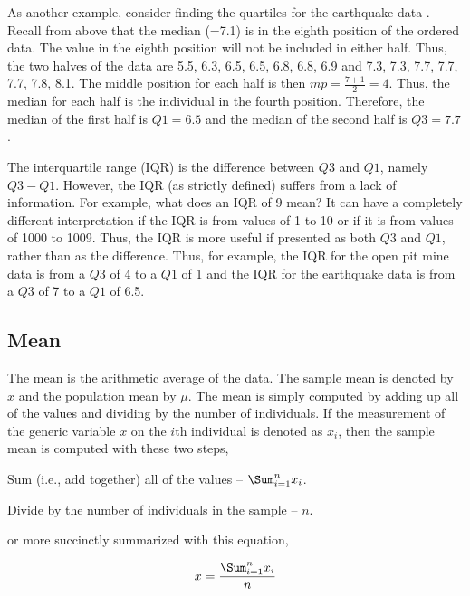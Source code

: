 \documentclass[10pt,openany]{book}\usepackage[]{graphicx}\usepackage[]{color}
\begin{document}
As another example, consider finding the quartiles for the earthquake data . Recall from above  that the median (=7.1) is in the eighth position of the ordered data. The value in the eighth position will not be included in either half. Thus, the two halves of the data are 5.5, 6.3, 6.5, 6.5, 6.8, 6.8, 6.9 and 7.3, 7.3, 7.7, 7.7, 7.7, 7.8, 8.1. The middle position for each half is then $mp=\frac{7+1}{2}=4$. Thus, the median for each half is the individual in the fourth position. Therefore, the median of the first half is $Q1=6.5$ and the median of the second half is $Q3=7.7$.

The interquartile range (IQR) is the difference between $Q3$ and $Q1$, namely $Q3-Q1$. However, the IQR (as strictly defined) suffers from a lack of information. For example, what does an IQR of 9 mean?  It can have a completely different interpretation if the IQR is from values of 1 to 10 or if it is from values of 1000 to 1009. Thus, the IQR is more useful if presented as both $Q3$ and $Q1$, rather than as the difference. Thus, for example, the IQR for the open pit mine data is from a $Q3$ of 4 to a $Q1$ of 1 and the IQR for the earthquake data is from a $Q3$ of 7 to a $Q1$ of 6.5.


\vspace{-12pt}


\subsection{Mean}
The mean is the arithmetic average of the data. The sample mean is denoted by $\bar{x}$ and the population mean by $\mu$. The mean is simply computed by adding up all of the values and dividing by the number of individuals. If the measurement of the generic variable $x$ on the $i$th individual is denoted as $x_{i}$, then the sample mean is computed with these two steps,
\begin{Enumerate}
  \item Sum (i.e., add together) all of the values -- $\Sum_{i=1}^{n}x_{i}$.
  \item Divide by the number of individuals in the sample -- $n$.
\end{Enumerate}
or more succinctly summarized with this equation,

\begin{equation} \label{eqn:SampleMean}
     \bar{x} = \frac{\Sum_{i=1}^{n}x_{i}}{n}
\end{equation}
\end{document}
